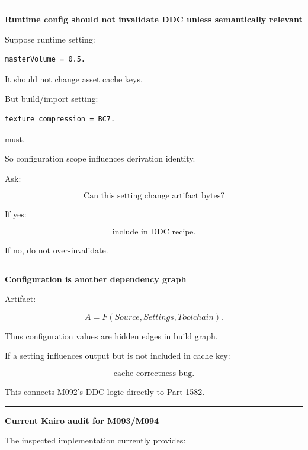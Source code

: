\begin{center}\rule{0.5\linewidth}{0.5pt}\end{center}

\textbf{Runtime config should not invalidate DDC unless semantically relevant}

Suppose runtime setting:

\begin{verbatim}
masterVolume = 0.5.
\end{verbatim}

It should not change asset cache keys.

But build/import setting:

\begin{verbatim}
texture compression = BC7.
\end{verbatim}

must.

So configuration scope influences derivation identity.

Ask:

\[
\text{Can this setting change artifact bytes?}
\]

If yes:

\[
\text{include in DDC recipe}.
\]

If no, do not over-invalidate.

\begin{center}\rule{0.5\linewidth}{0.5pt}\end{center}

\textbf{Configuration is another dependency graph}

Artifact:

\[
A=F(Source,Settings,Toolchain).
\]

Thus configuration values are hidden edges in build graph.

If a setting influences output but is not included in cache key:

\[
\text{cache correctness bug}.
\]

This connects M092's DDC logic directly to Part 1582.

\begin{center}\rule{0.5\linewidth}{0.5pt}\end{center}

\textbf{Current Kairo audit for M093/M094}

The inspected implementation currently provides:

